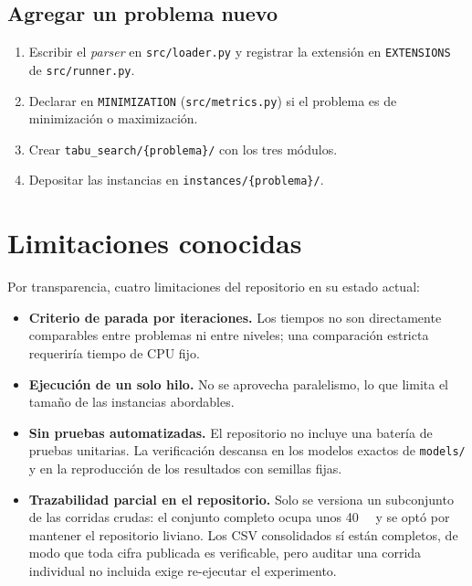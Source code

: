 \subsection{Agregar un problema nuevo}

\begin{enumerate}
  \item Escribir el \emph{parser} en \texttt{src/loader.py} y registrar la
    extensión en \texttt{EXTENSIONS} de \texttt{src/runner.py}.
  \item Declarar en \texttt{MINIMIZATION} (\texttt{src/metrics.py}) si el
    problema es de minimización o maximización.
  \item Crear \texttt{tabu\_search/\{problema\}/} con los tres módulos.
  \item Depositar las instancias en \texttt{instances/\{problema\}/}.
\end{enumerate}

\section{Limitaciones conocidas}

Por transparencia, cuatro limitaciones del repositorio en su estado actual:

\begin{itemize}
  \item \textbf{Criterio de parada por iteraciones.} Los tiempos no son
    directamente comparables entre problemas ni entre niveles; una
    comparación estricta requeriría tiempo de CPU fijo.
  \item \textbf{Ejecución de un solo hilo.} No se aprovecha paralelismo, lo
    que limita el tamaño de las instancias abordables.
  \item \textbf{Sin pruebas automatizadas.} El repositorio no incluye una
    batería de pruebas unitarias. La verificación descansa en los modelos
    exactos de \texttt{models/} y en la reproducción de los resultados con
    semillas fijas.
  \item \textbf{Trazabilidad parcial en el repositorio.} Solo se versiona un
    subconjunto de las corridas crudas: el conjunto completo ocupa unos
    \SI{40}{\mega\byte} y se optó por mantener el repositorio liviano. Los CSV
    consolidados sí están completos, de modo que toda cifra publicada es
    verificable, pero auditar una corrida individual no incluida exige
    re-ejecutar el experimento.
\end{itemize}
